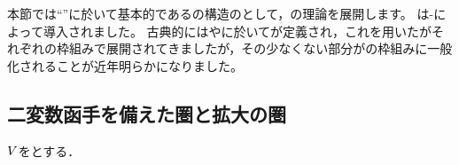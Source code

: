 \section{\WordExtriangulatedCategory}

本節では``\WordHomologicalAlgebra''に於いて基本的である\WordExtFunctor の構造の\WordFormalism として，\WordExtriangulatedCategory の理論を展開します。
\WordExtriangulatedCategory は\WordNakaoka-\WordPalu によって導入されました。
古典的には\WordTriangulatedCategory や\WordExactCategory に於いて\WordExtFunctor が定義され，これを用いた\WordHomologicalAlgebra がそれぞれの枠組みで展開されてきましたが，その少なくない部分が\WordExtriangulatedCategory の枠組みに一般化されることが近年明らかになりました。

\subsection{二変数函手を備えた圏と拡大の圏}

\begin{definition}
    \( \BenabouCosmos \)を\WordBenabouCosmos とする．
\end{definition}